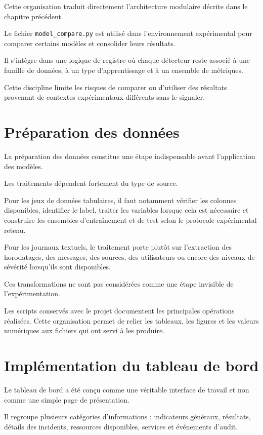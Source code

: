 Cette organisation traduit directement l'architecture modulaire décrite dans le chapitre précédent.

Le fichier \texttt{model\_compare.py} est utilisé dans l'environnement expérimental pour comparer certains modèles et consolider leurs résultats.

Il s'intègre dans une logique de registre où chaque détecteur reste associé à une famille de données, à un type d'apprentissage et à un ensemble de métriques.

Cette discipline limite les risques de comparer ou d'utiliser des résultats provenant de contextes expérimentaux différents sans le signaler.

\section{Préparation des données}

La préparation des données constitue une étape indispensable avant l'application des modèles.

Les traitements dépendent fortement du type de source.

Pour les jeux de données tabulaires, il faut notamment vérifier les colonnes disponibles, identifier le label, traiter les variables lorsque cela est nécessaire et construire les ensembles d'entraînement et de test selon le protocole expérimental retenu.

Pour les journaux textuels, le traitement porte plutôt sur l'extraction des horodatages, des messages, des sources, des utilisateurs ou encore des niveaux de sévérité lorsqu'ils sont disponibles.

Ces transformations ne sont pas considérées comme une étape invisible de l'expérimentation.

Les scripts conservés avec le projet documentent les principales opérations réalisées. Cette organisation permet de relier les tableaux, les figures et les valeurs numériques aux fichiers qui ont servi à les produire.

\section{Implémentation du tableau de bord}

Le tableau de bord a été conçu comme une véritable interface de travail et non comme une simple page de présentation.

Il regroupe plusieurs catégories d'informations : indicateurs généraux, résultats, détails des incidents, ressources disponibles, services et événements d'audit.

